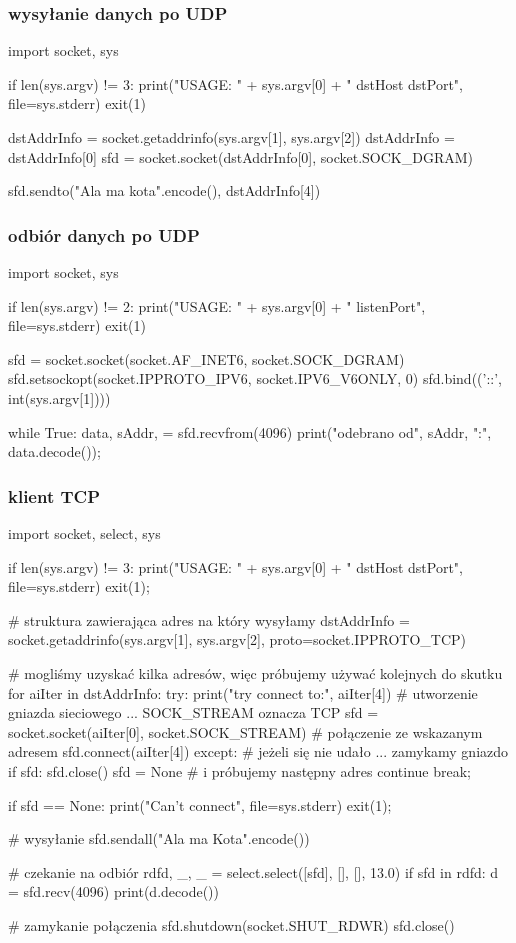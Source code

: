 \documentclass{pdfBooklets}
\begin{document}
\subsubsection{wysyłanie danych po UDP}
\begin{CodeFrame*}[python]{}
import socket, sys

if len(sys.argv) != 3:
  print("USAGE: " + sys.argv[0] + " dstHost dstPort", file=sys.stderr)
  exit(1)

dstAddrInfo = socket.getaddrinfo(sys.argv[1], sys.argv[2])
dstAddrInfo = dstAddrInfo[0]
sfd = socket.socket(dstAddrInfo[0], socket.SOCK_DGRAM)

sfd.sendto("Ala ma kota".encode(), dstAddrInfo[4])
\end{CodeFrame*}

\subsubsection{odbiór danych po UDP}
\begin{CodeFrame*}[python]{}
import socket, sys

if len(sys.argv) != 2:
  print("USAGE: " + sys.argv[0] + " listenPort", file=sys.stderr)
  exit(1)

sfd = socket.socket(socket.AF_INET6, socket.SOCK_DGRAM)
sfd.setsockopt(socket.IPPROTO_IPV6, socket.IPV6_V6ONLY, 0)
sfd.bind(('::', int(sys.argv[1])))

while True:
  data, sAddr, = sfd.recvfrom(4096)
  print("odebrano od", sAddr, ":", data.decode());
\end{CodeFrame*}

\subsubsection{klient TCP}
\begin{CodeFrame*}[python]{}
import socket, select, sys

if len(sys.argv) != 3:
	print("USAGE: " + sys.argv[0] + " dstHost dstPort", file=sys.stderr)
	exit(1);

# struktura zawierająca adres na który wysyłamy
dstAddrInfo = socket.getaddrinfo(sys.argv[1], sys.argv[2], proto=socket.IPPROTO_TCP)

# mogliśmy uzyskać kilka adresów, więc próbujemy używać kolejnych do skutku
for aiIter in dstAddrInfo:
	try:
		print("try connect to:", aiIter[4])
		# utworzenie gniazda sieciowego ... SOCK_STREAM oznacza TCP
		sfd = socket.socket(aiIter[0], socket.SOCK_STREAM)
		# połączenie ze wskazanym adresem
		sfd.connect(aiIter[4])
	except:
		# jeżeli się nie udało ... zamykamy gniazdo
		if sfd:
			sfd.close()
		sfd = None
		# i próbujemy następny adres
		continue
	break;

if sfd == None:
	print("Can't connect", file=sys.stderr)
	exit(1);

# wysyłanie
sfd.sendall("Ala ma Kota\n".encode())

# czekanie na odbiór
rdfd, _, _ = select.select([sfd], [], [], 13.0)
if sfd in rdfd:
	d = sfd.recv(4096)
	print(d.decode())

# zamykanie połączenia
sfd.shutdown(socket.SHUT_RDWR)
sfd.close()
\end{CodeFrame*}
\end{document}
